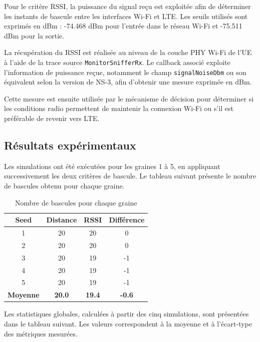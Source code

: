 Pour le critère RSSI, la puissance du signal reçu est exploitée
afin de déterminer les instants de bascule entre les interfaces
Wi-Fi et LTE. Les seuils utilisés sont exprimés en dBm :
-74.468 dBm pour l'entrée dans le réseau Wi-Fi et
-75.511 dBm pour la sortie.

La récupération du RSSI est réalisée au niveau de la couche
PHY Wi-Fi de l'UE à l'aide de la trace source
\texttt{MonitorSnifferRx}. Le callback associé exploite
l'information de puissance reçue, notamment le champ
\texttt{signalNoiseDbm} ou son équivalent selon la version
de NS-3, afin d'obtenir une mesure exprimée en dBm.

Cette mesure est ensuite utilisée par le mécanisme de décision
pour déterminer si les conditions radio permettent de maintenir
la connexion Wi-Fi ou s'il est préférable de revenir vers LTE.

\subsection{Résultats expérimentaux}

Les simulations ont été exécutées pour les graines 1 à 5,
en appliquant successivement les deux critères de bascule.
Le tableau suivant présente le nombre de bascules obtenu
pour chaque graine.

\begin{table}[H]
\centering
\caption{Nombre de bascules pour chaque graine}
\label{tab:q7_switches_seed}
\begin{tabular}{|c|c|c|c|}
\hline
\textbf{Seed} & \textbf{Distance} & \textbf{RSSI}
& \textbf{Différence} \\
\hline
1 & 20 & 20 & 0 \\
2 & 20 & 20 & 0 \\
3 & 20 & 19 & -1 \\
4 & 20 & 19 & -1 \\
5 & 20 & 19 & -1 \\
\hline
\textbf{Moyenne} & \textbf{20.0} & \textbf{19.4}
& \textbf{-0.6} \\
\hline
\end{tabular}
\end{table}

Les statistiques globales, calculées à partir des cinq
simulations, sont présentées dans le tableau suivant.
Les valeurs correspondent à la moyenne et à l'écart-type
des métriques mesurées.

